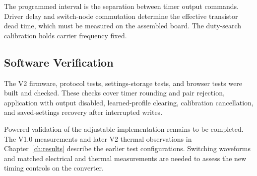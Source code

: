 The programmed interval is the separation between timer output commands. Driver delay and switch-node commutation determine the effective transistor dead time, which must be measured on the assembled board. The duty-search calibration holds carrier frequency fixed.

\subsection{Software Verification}

The V2 firmware, protocol tests, settings-storage tests, and browser tests were built and checked. These checks cover timer rounding and pair rejection, application with output disabled, learned-profile clearing, calibration cancellation, and saved-settings recovery after interrupted writes.

Powered validation of the adjustable implementation remains to be completed. The V1.0 measurements and later V2 thermal observations in Chapter~\ref{ch:results} describe the earlier test configurations. Switching waveforms and matched electrical and thermal measurements are needed to assess the new timing controls on the converter.
